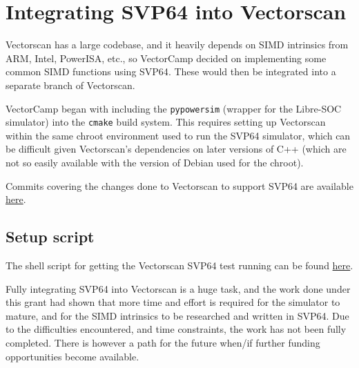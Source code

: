 %
\section{Integrating \acrshort{SVP64} into Vectorscan}

Vectorscan has a large codebase, and it heavily depends on \acrshort{SIMD} intrinsics from
\acrshort{ARM}, Intel, PowerISA, etc., so VectorCamp decided on implementing some common
\acrshort{SIMD} functions using \acrshort{SVP64}. These would then be integrated into a separate
branch of Vectorscan.

VectorCamp began with including the \texttt{pypowersim} (wrapper for the
Libre-SOC simulator) into the \texttt{cmake} build system. This requires
setting up Vectorscan within the same chroot environment used to run the SVP64
simulator, which can be difficult given Vectorscan's dependencies on later
versions of C++ (which are not so easily available with the version of Debian
used for the chroot).

Commits covering the changes done to Vectorscan to support \acrshort{SVP64} are available
\href{https://github.com/ngisearchsvp64/vectorscan/commits/feature/svp64-port/}{here}.

\subsection{Setup script}
The shell script for getting the Vectorscan \acrshort{SVP64} test running can be found
\href{https://github.com/ngisearchsvp64/shell-scripts/blob/main/scripts/ngi-search-vectorscan}{here}.

Fully integrating \acrshort{SVP64} into Vectorscan is a huge task, and the work
done under this grant had shown that more time and effort is required for the
simulator to mature, and for the \acrshort{SIMD} intrinsics to be researched
and written in \acrshort{SVP64}.
Due to the difficulties encountered, and time constraints, the work has not
been fully completed.
There is however a path for the future when/if further funding
opportunities become available.
